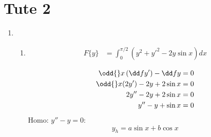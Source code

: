 \documentclass{E:/Documents/Latex/myassignment}
\begin{document}
\section{Tute 2}
\begin{enumerate}
	\item 
	\begin{enumerate}
		\item 
		\begin{align*}
			F\{y\} &= \int_0^{\pi/2} (y^2 + y'^2 - 2y\sin x) dx 
		\end{align*}
		
		\begin{align*}
			\odd{}x\left(\dd f{y'}\right) - \dd f{y} =0\\
			\odd{}x(2y') - 2y + 2\sin x = 0\\
			2y'' - 2y + 2\sin x = 0\\
			y'' - y + \sin x = 0\\
		\end{align*}
		Homo:
		$y'' - y = 0$:
		\[y_h = a\sin x + b\cos x \]


\end{enumerate}
\end{enumerate}
\end{document}

